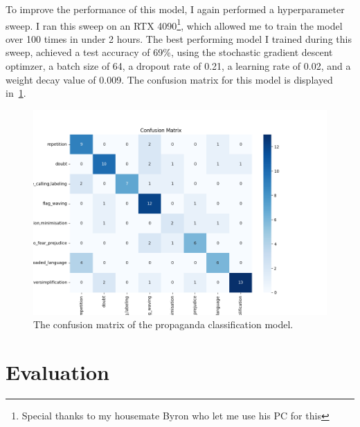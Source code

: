 \documentclass[twocolumn]{article}
\begin{document}
To improve the performance of this model, I again performed a hyperparameter sweep. I ran this sweep on an RTX 4090\footnote{Special thanks to my housemate Byron who let me use his PC for this}, which allowed me to train the model over 100 times in under 2 hours. The best performing model I trained during this sweep, achieved a test accuracy of 69\%, using the stochastic gradient descent optimzer, a batch size of 64, a dropout rate of 0.21, a learning rate of 0.02, and a weight decay value of 0.009. The confusion matrix for this model is displayed in~\ref{fig:classification-cm}. 

\begin{figure}
    \centering
    \includegraphics[scale=0.3]{../assets/propaganda-classification-confusion-matrix.png}
    \caption{The confusion matrix of the propaganda classification model.}
    \label{fig:classification-cm}
\end{figure}

\section{Evaluation}

\begingroup
\setlength{\tabcolsep}{10pt} %
\end{document}
